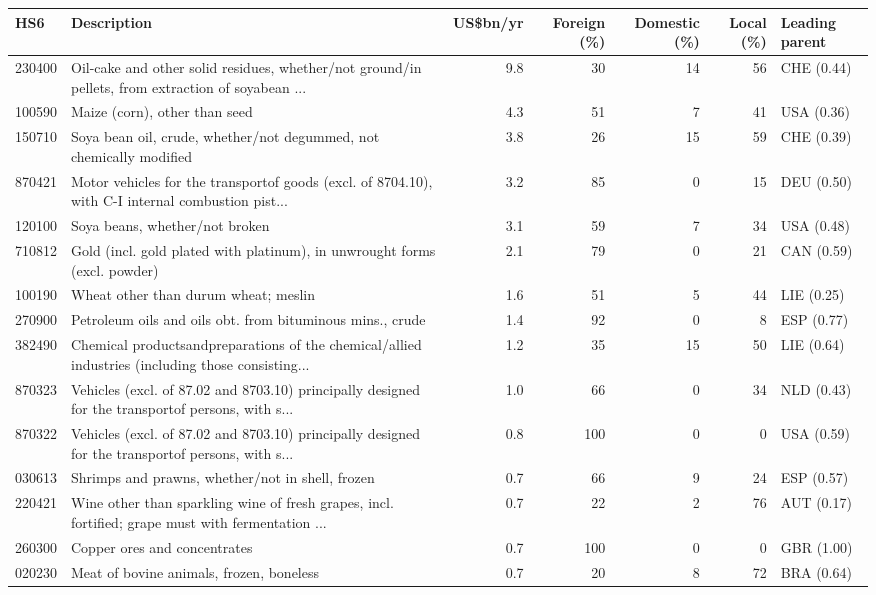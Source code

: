 \begin{tabular}{@{}l p{6.4cm} r r r r l@{}}
\toprule
HS6 & Description & US\$bn/yr & Foreign (\%) & Domestic (\%) & Local (\%) & Leading parent \\
\midrule
230400 & Oil-cake and other solid residues, whether/\allowbreak{}not ground/\allowbreak{}in pellets, from extraction of soyabean ... & 9.8 & 30 & 14 & 56 & CHE (0.44) \\
100590 & Maize (corn), other than seed & 4.3 & 51 & 7 & 41 & USA (0.36) \\
150710 & Soya bean oil, crude, whether/\allowbreak{}not degummed, not chemically modified & 3.8 & 26 & 15 & 59 & CHE (0.39) \\
870421 & Motor vehicles for the transportof goods (excl. of 8704.10), with C-I internal combustion pist... & 3.2 & 85 & 0 & 15 & DEU (0.50) \\
120100 & Soya beans, whether/\allowbreak{}not broken & 3.1 & 59 & 7 & 34 & USA (0.48) \\
710812 & Gold (incl. gold plated with platinum), in unwrought forms (excl. powder) & 2.1 & 79 & 0 & 21 & CAN (0.59) \\
100190 & Wheat other than durum wheat; meslin & 1.6 & 51 & 5 & 44 & LIE (0.25) \\
270900 & Petroleum oils and oils obt. from bituminous mins., crude & 1.4 & 92 & 0 & 8 & ESP (0.77) \\
382490 & Chemical productsandpreparations of the chemical/\allowbreak{}allied industries (including those consisting... & 1.2 & 35 & 15 & 50 & LIE (0.64) \\
870323 & Vehicles (excl. of 87.02 and 8703.10) principally designed for the transportof persons, with s... & 1.0 & 66 & 0 & 34 & NLD (0.43) \\
870322 & Vehicles (excl. of 87.02 and 8703.10) principally designed for the transportof persons, with s... & 0.8 & 100 & 0 & 0 & USA (0.59) \\
030613 & Shrimps and prawns, whether/\allowbreak{}not in shell, frozen & 0.7 & 66 & 9 & 24 & ESP (0.57) \\
220421 & Wine other than sparkling wine of fresh grapes, incl. fortified; grape must with fermentation ... & 0.7 & 22 & 2 & 76 & AUT (0.17) \\
260300 & Copper ores and concentrates & 0.7 & 100 & 0 & 0 & GBR (1.00) \\
020230 & Meat of bovine animals, frozen, boneless & 0.7 & 20 & 8 & 72 & BRA (0.64) \\
\bottomrule
\end{tabular}
